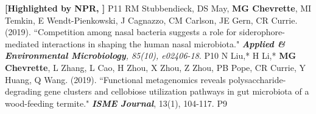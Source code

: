 \begin{cvpubs}
{    \linebreak \textbf{[Highlighted by NPR, \textit{}]}
    } %
    {P11} %
  \cvpub
    {RM Stubbendieck, DS May, \textbf{MG Chevrette}, MI Temkin, E Wendt-Pienkowski, J Cagnazzo, CM Carlson, JE Gern, CR Currie. (2019). ``Competition among nasal bacteria suggests a role for siderophore-mediated interactions in shaping the human nasal microbiota." \textit{\textbf{Applied \& Environmental Microbiology}, 85(10), e02406-18}. \textbf{\textit{}}
    } %
    {P10} %
  \cvpub
    {N Liu,* H Li,* \textbf{MG Chevrette}, L Zhang, L Cao, H Zhou, X Zhou, Z Zhou, PB Pope, CR Currie, Y Huang, Q Wang. (2019). ``Functional metagenomics reveals polysaccharide-degrading gene clusters and cellobiose utilization pathways in gut microbiota of a wood-feeding termite." \textit{\textbf{ISME Journal}}, 13(1), 104-117. \textbf{\textit{}}     
    } %
    {P9} %
\end{cvpubs}
